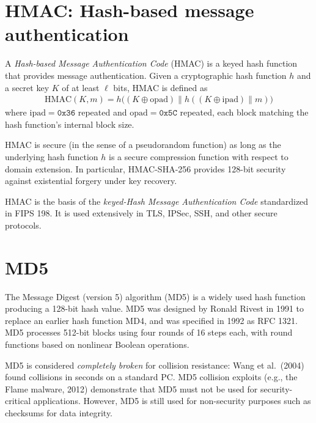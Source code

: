 \documentclass[a4paper, 12pt]{book} %
\begin{document}
\section{HMAC: Hash-based message authentication}

\begin{definition}
    A \emph{Hash-based Message Authentication Code} (HMAC) is a keyed hash function that provides message authentication. Given a cryptographic hash function $h$ and a secret key $K$ of at least $\ell$ bits, HMAC is defined as
    \begin{align}
        \mathrm{HMAC}(K, m) = h\big( (K \oplus \mathrm{opad}) \| h((K \oplus \mathrm{ipad}) \| m) \big)
    \end{align}
    where $\mathrm{ipad} = \texttt{0x36}$ repeated and $\mathrm{opad} = \texttt{0x5C}$ repeated, each block matching the hash function's internal block size.
\end{definition}

\begin{proposition}
    HMAC is secure (in the sense of a pseudorandom function) as long as the underlying hash function $h$ is a secure compression function with respect to domain extension. In particular, HMAC-SHA-256 provides 128-bit security against existential forgery under key recovery.
\end{proposition}

\begin{remark}
    HMAC is the basis of the \emph{keyed-Hash Message Authentication Code} standardized in FIPS 198. It is used extensively in TLS, IPSec, SSH, and other secure protocols.
\end{remark}

\section{MD5}

The Message Digest (version 5) algorithm (MD5) is a widely used hash function producing a 128-bit hash value. MD5 was designed by Ronald Rivest in 1991 to replace an earlier hash function MD4, and was specified in 1992 as RFC 1321. MD5 processes 512-bit blocks using four rounds of 16 steps each, with round functions based on nonlinear Boolean operations.

\begin{example}
    MD5 is considered \emph{completely broken} for collision resistance: Wang et al.\ (2004) found collisions in seconds on a standard PC. MD5 collision exploits (e.g., the Flame malware, 2012) demonstrate that MD5 must not be used for security-critical applications. However, MD5 is still used for non-security purposes such as checksums for data integrity.
\end{example}
\end{document}
